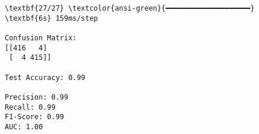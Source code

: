 \documentclass[11pt]{article}
\begin{document}
    \begin{Verbatim}[commandchars=\\\{\}]
\textbf{27/27} \textcolor{ansi-green}{━━━━━━━━━━━━━━━━━━━━} \textbf{6s} 159ms/step

Confusion Matrix:
[[416   4]
 [  4 415]]

Test Accuracy: 0.99

Precision: 0.99
Recall: 0.99
F1-Score: 0.99
AUC: 1.00
    \end{Verbatim}

    \begin{center}
    \end{center}
    { \hspace*{\fill} \\}
    
\end{document}
